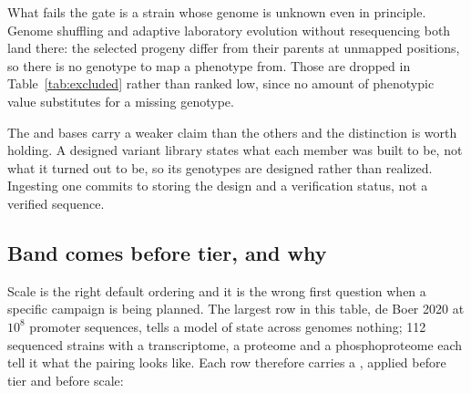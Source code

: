 What fails the gate is a strain whose genome is unknown even in principle. Genome shuffling
and adaptive laboratory evolution without resequencing both land there: the selected
progeny differ from their parents at unmapped positions, so there is no genotype to map a
phenotype from. Those are dropped in Table~\ref{tab:excluded} rather than ranked low, since
no amount of phenotypic value substitutes for a missing genotype.

The  and  bases carry a weaker claim than the
others and the distinction is worth holding. A designed variant library states what each
member was built to be, not what it turned out to be, so its genotypes are designed rather
than realized. Ingesting one commits to storing the design and a verification status, not a
verified sequence.

\subsection{Band comes before tier, and why}\label{sec:band}

Scale is the right default ordering and it is the wrong first question when a specific
campaign is being planned. The largest row in this table, de Boer 2020 at $10^8$ promoter
sequences, tells a model of state across genomes nothing; 112 sequenced strains with a
transcriptome, a proteome and a phosphoproteome each tell it what the pairing looks like.
Each row therefore carries a , applied before tier and before scale:

